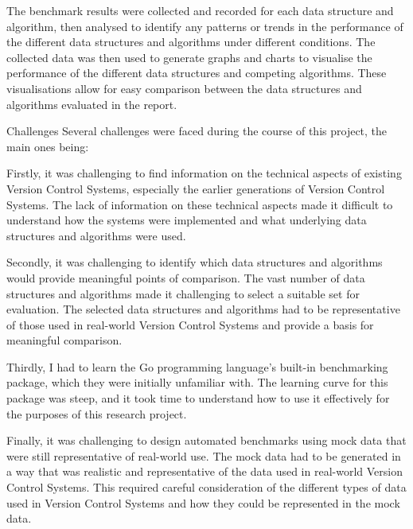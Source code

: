 \documentclass[a4paper,12pt]{article}
\makeatletter
\renewcommand{\section}{\needspace{.25\textheight} \@startsection{section}{1}{0mm}
  {\baselineskip}
  {\baselineskip}{\Large\bfseries\scshape}}
\makeatother
\begin{document}
The benchmark results were collected and recorded for each data structure and algorithm, then analysed to identify any patterns or trends in the performance of the different data structures and algorithms under different conditions. The collected data was then used to generate graphs and charts to visualise the performance of the different data structures and competing algorithms. These visualisations allow for easy comparison between the data structures and algorithms evaluated in the report.

\section{Challenges}
Several challenges were faced during the course of this project, the main ones being:

Firstly, it was challenging to find information on the technical aspects of existing Version Control Systems, especially the earlier generations of Version Control Systems. The lack of information on these technical aspects made it difficult to understand how the systems were implemented and what underlying data structures and algorithms were used.
\vspace{9pt}

Secondly, it was challenging to identify which data structures and algorithms would provide meaningful points of comparison. The vast number of data structures and algorithms made it challenging to select a suitable set for evaluation. The selected data structures and algorithms had to be representative of those used in real-world Version Control Systems and provide a basis for meaningful comparison.
\vspace{9pt}

Thirdly, I had to learn the Go programming language's built-in benchmarking package, which they were initially unfamiliar with. The learning curve for this package was steep, and it took time to understand how to use it effectively for the purposes of this research project.
\vspace{9pt}

Finally, it was challenging to design automated benchmarks using mock data that were still representative of real-world use. The mock data had to be generated in a way that was realistic and representative of the data used in real-world Version Control Systems. This required careful consideration of the different types of data used in Version Control Systems and how they could be represented in the mock data.
\end{document}
